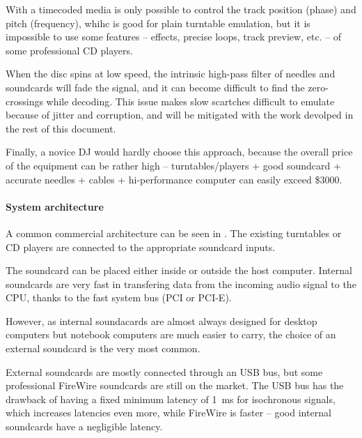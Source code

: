 \documentclass[a4paper,10pt]{article}
\begin{document}
\begin{multicols}{2}
With a timecoded media is only possible to control the track position (phase)
and pitch (frequency), whihc is good for plain turntable emulation, but it is
impossible to use some features -- effects, precise loops, track preview, etc.
-- of some professional CD players.

When the disc spins at low speed, the intrinsic high-pass filter of needles
and soundcards will fade the signal, and it can become difficult to find the
zero-crossings while decoding. This issue makes slow scartches difficult to
emulate because of jitter and corruption, and will be mitigated with the work
devolped in the rest of this document.

Finally, a novice DJ would hardly choose this approach, because the overall
price of the equipment can be rather high -- turntables/players + good
soundcard + accurate needles + cables + hi-performance computer can easily
exceed \$3000. 


\paragraph{System architecture}
A common commercial architecture \cite{rane_ssl} \cite{ni_tsp} can be seen in
. The existing turntables or CD players are connected
to the appropriate soundcard inputs.

The soundcard can be placed either inside or outside the host computer.
Internal soundcards are very fast in transfering data from the incoming audio
signal to the CPU, thanks to the fast system bus (PCI or PCI-E).

However, as internal soundacards are almost always designed for desktop
computers but notebook computers are much easier to carry, the choice of an
external soundcard is the very most common.

External soundcards are mostly connected through an USB bus, but some
professional FireWire soundcards are still on the market. The USB bus has the
drawback of having a fixed minimum latency of 1~ms for isochronous signals,
which increases latencies even more, while FireWire is faster -- good internal
soundcards have a negligible latency.


\end{multicols}
\end{document}
